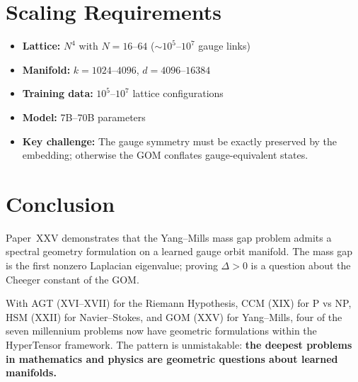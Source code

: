 \documentclass{article}
\begin{document}
\section{Scaling Requirements}
\label{sec:scaling}

\begin{itemize}
  \item \textbf{Lattice:} $N^4$ with $N = 16$--$64$ ($\sim 10^5$--$10^7$
    gauge links)
  \item \textbf{Manifold:} $k = 1024$--$4096$, $d = 4096$--$16384$
  \item \textbf{Training data:} $10^5$--$10^7$ lattice configurations
  \item \textbf{Model:} 7B--70B parameters
  \item \textbf{Key challenge:} The gauge symmetry must be exactly preserved
    by the embedding; otherwise the GOM conflates gauge-equivalent states.
\end{itemize}

\section{Conclusion}
\label{sec:conclusion}

Paper~XXV demonstrates that the Yang--Mills mass gap problem admits a spectral
geometry formulation on a learned gauge orbit manifold.  The mass gap is the
first nonzero Laplacian eigenvalue; proving $\Delta > 0$ is a question about
the Cheeger constant of the GOM.

With AGT (XVI--XVII) for the Riemann Hypothesis, CCM (XIX) for P vs NP, HSM
(XXII) for Navier--Stokes, and GOM (XXV) for Yang--Mills, four of the seven
millennium problems now have geometric formulations within the HyperTensor
framework.  The pattern is unmistakable: \textbf{the deepest problems in
mathematics and physics are geometric questions about learned manifolds.}
\end{document}
